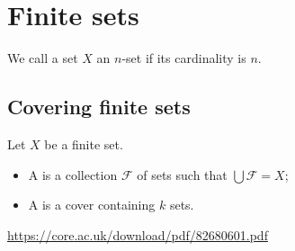 \section{Finite sets}
\begin{definition}
We call a set $X$ an $n$-set if its cardinality is $n$.
\end{definition}

\subsection{Covering finite sets}
\begin{definition}
Let $X$ be a finite set.
\begin{itemize}
\item A  is a collection $\mathcal{F}$ of sets such that $\bigcup \mathcal{F} = X$;
\item A  is a cover containing $k$ sets.
\end{itemize}
\end{definition}

\url{https://core.ac.uk/download/pdf/82680601.pdf}
